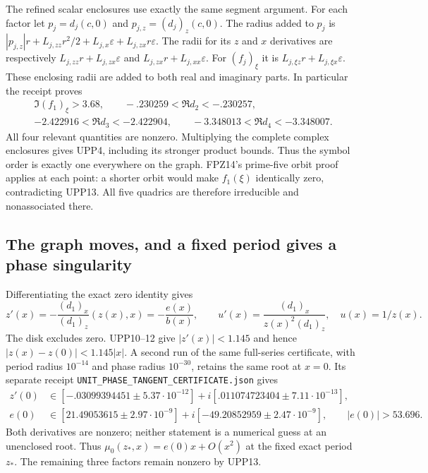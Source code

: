 The refined scalar enclosures use exactly the same segment argument.
For each factor let $p_j=d_j(c,0)$ and $p_{j,z}=(d_j)_z(c,0)$.
The radius added to $p_j$ is
$|p_{j,z}|r+L_{j,zz}r^2/2+L_{j,x}\varepsilon
+L_{j,zx}r\varepsilon$.
The radii for its $z$ and $x$ derivatives are respectively
$L_{j,zz}r+L_{j,zx}\varepsilon$ and
$L_{j,zx}r+L_{j,xx}\varepsilon$.
For $(f_j)_\xi$ it is
$L_{j,\xi z}r+L_{j,\xi x}\varepsilon$.
These enclosing radii are added to both real and imaginary parts.
In particular the receipt proves
\[
 \begin{gathered}
 \Im(f_1)_\xi>3.68,\qquad
 -.230259<\Re d_2<-.230257,\\
 -2.422916<\Re d_3<-2.422904,\qquad
 -3.348013<\Re d_4<-3.348007.
 \end{gathered}\tag{UPP13}
\]
All four relevant quantities are nonzero. Multiplying the complete
complex enclosures gives UPP4, including its stronger product bounds.
Thus the symbol order is exactly one everywhere on the graph.
FPZ14's prime-five orbit proof applies at each point: a shorter
orbit would make $f_1(\xi)$ identically zero, contradicting UPP13.
All five quadrics are therefore irreducible and nonassociated there.

\subsection{The graph moves, and a fixed period gives a phase singularity}
Differentiating the exact zero identity gives
\[
 z'(x)=-\frac{(d_1)_x}{(d_1)_z}(z(x),x)
       =-\frac{e(x)}{b(x)},\qquad
 u'(x)=\frac{(d_1)_x}{z(x)^2(d_1)_z},\quad u(x)=1/z(x).
 \tag{UPP14}
\]
The disk excludes zero. UPP10--12 give $|z'(x)|<1.145$ and hence
$|z(x)-z(0)|<1.145|x|$. A second run of the same full-series
certificate, with period radius $10^{-14}$ and phase radius
$10^{-30}$, retains the same root at $x=0$. Its separate receipt
\texttt{UNIT\_PHASE\_TANGENT\_CERTIFICATE.json} gives
\[
 \begin{aligned}
 z'(0)&\in[-.03099394451\pm5.37\cdot10^{-12}]
       +i[.011074723404\pm7.11\cdot10^{-13}],\\
 e(0)&\in[21.49053615\pm2.97\cdot10^{-9}]
       +i[-49.20852959\pm2.47\cdot10^{-9}],\qquad |e(0)|>53.696.
 \end{aligned}\tag{UPP15}
\]
Both derivatives are nonzero; neither statement is a numerical
guess at an unenclosed root. Thus $\mu_0(z_*,x)=e(0)x+O(x^2)$
at the fixed exact period $z_*$. The remaining three factors remain
nonzero by UPP13.

